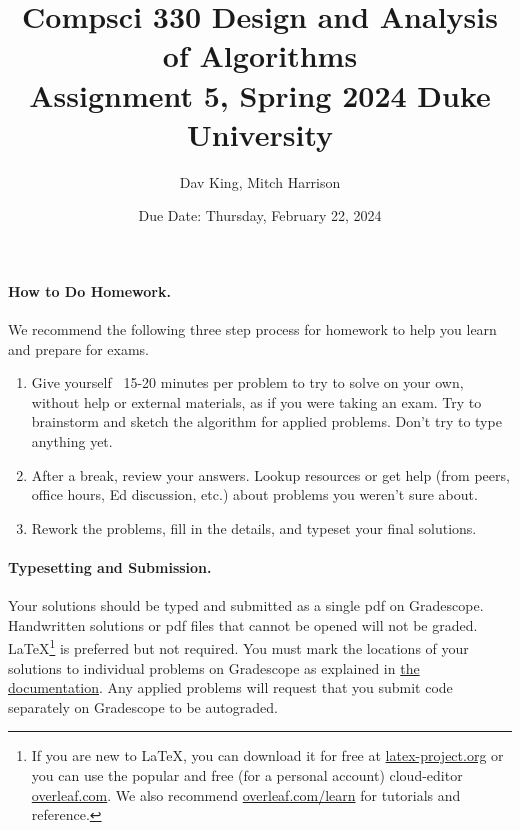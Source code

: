 \documentclass[11pt]{article}
\title{\vspace{-0.5in}Compsci 330 Design and Analysis of Algorithms \\Assignment 5, Spring 2024 Duke University}
\author{Dav King, Mitch Harrison}
\date{Due Date: Thursday, February 22, 2024}
\begin{document}
\maketitle



\paragraph{How to Do Homework.} We recommend the following three step process for homework to help you learn and prepare for exams.
\begin{enumerate}
	\item Give yourself ~15-20 minutes per problem to try to solve on your own, without help or external materials, as if you were taking an exam. Try to brainstorm and sketch the algorithm for applied problems. Don't try to type anything yet.
	\item After a break, review your answers. Lookup resources or get help (from peers, office hours, Ed discussion, etc.) about problems you weren't sure about.
	\item Rework the problems, fill in the details, and typeset your final solutions.
\end{enumerate}

\paragraph{Typesetting and Submission.} Your solutions should be typed and submitted as a single pdf on Gradescope. Handwritten solutions or pdf files that cannot be opened will not be graded. \LaTeX \footnote{If you are new to \LaTeX, you can download it for free at \href{https://www.latex-project.org}{latex-project.org} or you can use the popular and free (for a personal account) cloud-editor \href{https://www.overleaf.com}{overleaf.com}. We also recommend \href{https://www.overleaf.com/learn}{overleaf.com/learn} for tutorials and reference.} is preferred but not required. %
You must mark the locations of your solutions to individual problems on Gradescope as explained in \href{https://help.gradescope.com/article/ccbpppziu9-student-submit-work#submitting_a_pdf}{the documentation}. Any applied problems will request that you submit code separately on Gradescope to be autograded. 
\end{document}
